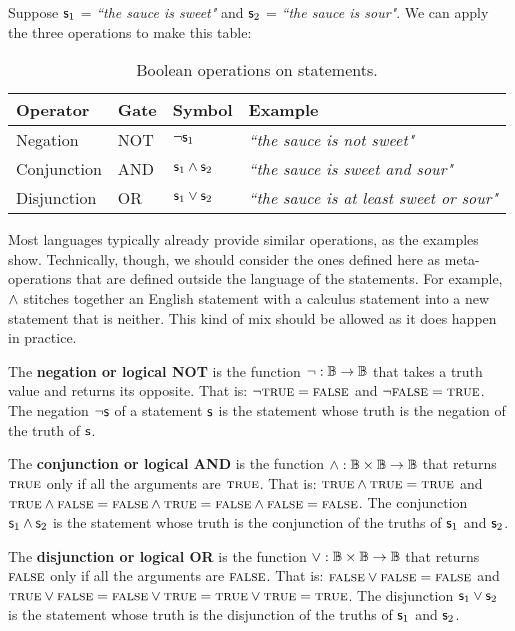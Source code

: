 \documentclass[11pt,letterpaper,fleqn]{memoir} %
\begin{document}
Suppose $\mathsf{s}_1$ = \emph{``the sauce is sweet"} and $\mathsf{s}_2$ = \emph{``the sauce is sour"}. We can apply the three operations to make this table:

\begin{table}[h]
	\centering
	\begin{tabular}{p{} p{} p{} p{}}
		Operator & Gate & Symbol & Example \\ 
		\hline 
		Negation & NOT & $\neg \mathsf{s}_1$ &  \emph{``the sauce is not sweet"} \\ 
		Conjunction & AND & $\mathsf{s}_1 \wedge \mathsf{s}_2$ & \emph{``the sauce is sweet and sour"} \\ 
		Disjunction & OR & $\mathsf{s}_1 \vee \mathsf{s}_2$ & \emph{``the sauce is at least sweet or sour"}
	\end{tabular} 
	\caption{Boolean operations on statements.}
\end{table}

Most languages typically already provide similar operations, as the examples show. Technically, though, we should consider the ones defined here as meta-operations that are defined outside the language of the statements. For example, $\wedge$ stitches together an English statement with a calculus statement into a new statement that is neither. This kind of mix should be allowed as it does happen in practice.

\begin{mathSection}
	\begin{defn}
		The \textbf{negation or logical NOT} is the function $\neg : \mathbb{B} \to \mathbb{B}$ that takes a truth value and returns its opposite. That is: $\neg \textsc{true} = \textsc{false}$ and $\neg \textsc{false} = \textsc{true}$. The negation $\neg \mathsf{s}$ of a statement $\mathsf{s}$ is the statement whose truth is the negation of the truth of $\mathsf{s}$.
	\end{defn}
	
	\begin{defn}
		The \textbf{conjunction or logical AND} is the function $\wedge : \mathbb{B} \times \mathbb{B} \to \mathbb{B}$ that returns $\textsc{true}$ only if all the arguments are $\textsc{true}$. That is: $\textsc{true} \wedge \textsc{true} = \textsc{true}$ and $\textsc{true} \wedge \textsc{false} =\textsc{false} \wedge \textsc{true} =\textsc{false} \wedge \textsc{false} = \textsc{false}$. The conjunction $\mathsf{s}_1 \wedge \mathsf{s}_2$ is the statement whose truth is the conjunction of the truths of $\mathsf{s}_1$ and $\mathsf{s}_2$.
	\end{defn}
	
	\begin{defn}
		The \textbf{disjunction or logical OR} is the function $\vee : \mathbb{B} \times \mathbb{B} \to \mathbb{B}$ that returns $\textsc{false}$ only if all the arguments are $\textsc{false}$. That is: $\textsc{false} \vee \textsc{false} = \textsc{false}$ and $\textsc{true} \vee \textsc{false} =\textsc{false} \vee \textsc{true} =\textsc{true} \vee \textsc{true} = \textsc{true}$. The disjunction $\mathsf{s}_1 \vee \mathsf{s}_2$ is the statement whose truth is the disjunction of the truths of $\mathsf{s}_1$ and $\mathsf{s}_2$.
	\end{defn}
\end{mathSection}
\end{document}

